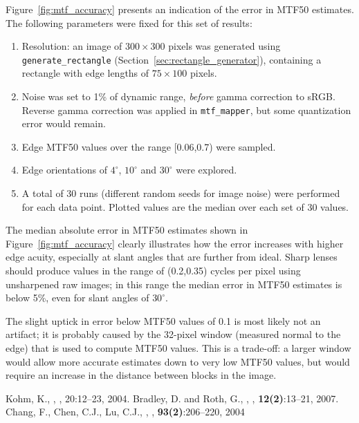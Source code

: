 \documentclass[a4paper]{article}
\begin{document}
Figure~\ref{fig:mtf_accuracy} presents an indication of the error in MTF50
estimates. The following parameters were fixed for this set of results:
\begin{enumerate}
  \item Resolution: an image of $300\times300$ pixels was generated using
\texttt{generate\_rectangle} (Section~\ref{sec:rectangle_generator}), 
containing a rectangle with edge lengths of $75\times100$ pixels.
  \item Noise was set to 1\% of dynamic range, \emph{before} gamma
correction to sRGB. Reverse gamma correction was applied in
\texttt{mtf\_mapper}, but some quantization error would remain.
  \item Edge MTF50 values over the range [0.06,0.7) were sampled.
  \item Edge orientations of $4^\circ$, $10^\circ$ and $30^\circ$ were
explored.
  \item A total of 30 runs (different random seeds for image noise) were
performed for each data point. Plotted values are the median over each set
of 30 values.
\end{enumerate}
The median absolute error in MTF50 estimates shown in
Figure~\ref{fig:mtf_accuracy} clearly illustrates how the error increases
with higher edge acuity, especially at slant angles that are further from
ideal. Sharp lenses should produce values in the range of (0.2,0.35) cycles
per pixel using unsharpened raw images; in this range the median error in
MTF50 estimates is below 5\%, even for slant angles of $30^\circ$.

The slight uptick in error below MTF50 values of 0.1 is most likely not an
artifact; it is probably caused by the 32-pixel window (measured normal to
the edge) that is used to compute MTF50 values. This is a trade-off: a
larger window would allow more accurate estimates down to very low MTF50
values, but would require an increase in the distance between blocks in the
image.



\begin{thebibliography}{9}
 Kohm, K., , , 20:12--23, 2004.
 Bradley, D. and Roth, G.,
,
, \textbf{12(2)}:13--21,
2007.
 Chang, F., Chen, C.J., Lu, C.J.,
,
, \textbf{93(2)}:206--220,
2004
\end{thebibliography}
\end{document}
